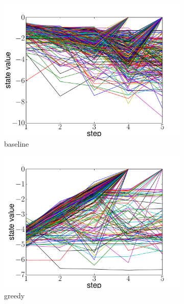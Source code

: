 \begin{figure}
  \centering
  \begin{subfigure}[b]{0.48\linewidth}
    \includegraphics[width=\textwidth]{figures/state_value_baseline.pdf}
    \caption{baseline}
    \label{fig:value_baseline}
  \end{subfigure}
  \begin{subfigure}[b]{0.48\linewidth}
    \includegraphics[width=\textwidth]{figures/state_value_greedy.pdf}
    \caption{greedy}
    \label{fig:value_greedy}
  \end{subfigure}
  \begin{subfigure}[b]{0.48\linewidth}

\end{subfigure}
\end{figure}
